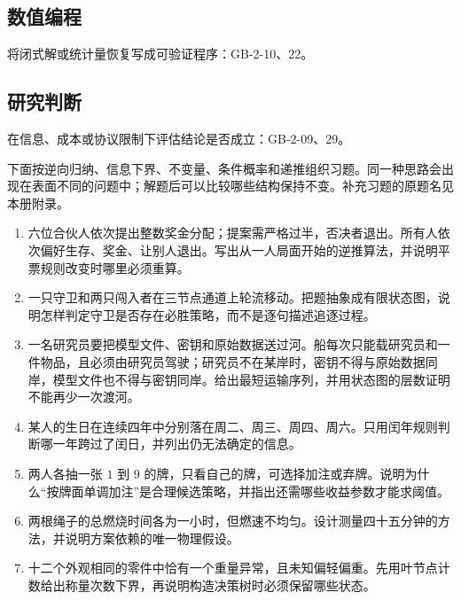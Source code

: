 \subsection*{数值编程}
将闭式解或统计量恢复写成可验证程序：GB-2-10、22。

\subsection*{研究判断}
在信息、成本或协议限制下评估结论是否成立：GB-2-09、29。

下面按逆向归纳、信息下界、不变量、条件概率和递推组织习题。同一种思路会出现在表面不同的问题中；解题后可以比较哪些结构保持不变。补充习题的原题名见本册附录。

\begin{enumerate}[leftmargin=*]
  \item {}六位合伙人依次提出整数奖金分配；提案需严格过半，否决者退出。所有人依次偏好生存、奖金、让别人退出。写出从一人局面开始的逆推算法，并说明平票规则改变时哪里必须重算。
  \item {}一只守卫和两只闯入者在三节点通道上轮流移动。把题抽象成有限状态图，说明怎样判定守卫是否存在必胜策略，而不是逐句描述追逐过程。
  \item {}一名研究员要把模型文件、密钥和原始数据送过河。船每次只能载研究员和一件物品，且必须由研究员驾驶；研究员不在某岸时，密钥不得与原始数据同岸，模型文件也不得与密钥同岸。给出最短运输序列，并用状态图的层数证明不能再少一次渡河。
  \item {}某人的生日在连续四年中分别落在周二、周三、周四、周六。只用闰年规则判断哪一年跨过了闰日，并列出仍无法确定的信息。
  \item {}两人各抽一张 $1$ 到 $9$ 的牌，只看自己的牌，可选择加注或弃牌。说明为什么“按牌面单调加注”是合理候选策略，并指出还需哪些收益参数才能求阈值。
  \item {}两根绳子的总燃烧时间各为一小时，但燃速不均匀。设计测量四十五分钟的方法，并说明方案依赖的唯一物理假设。
  \item {}十二个外观相同的零件中恰有一个重量异常，且未知偏轻偏重。先用叶节点计数给出称量次数下界，再说明构造决策树时必须保留哪些状态。

\end{enumerate}
